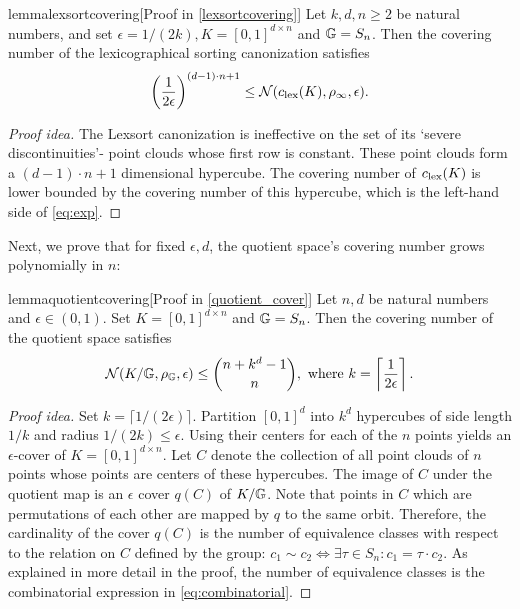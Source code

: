\begin{restatable}{lemma}{lexsortcovering}[Proof in \ref{lexsortcovering}]
\label{lem:lexsortcovering}
Let $k,d,n\geq 2$ be natural numbers, and set $\epsilon=1/(2k), K=[0,1]^{d\times n}$ and $\mathbb{G}=S_n$. Then the covering number of the lexicographical sorting canonization satisfies
\begin{equation}
\label{eq:exp}
\left( \frac{1}{2\epsilon}\right)^{(d-1)\cdot n + 1}\leq \mathcal{N}(c_{\mathrm{lex}}(K),\rho_\infty,\epsilon).
\end{equation}
\end{restatable}
\begin{proof}[Proof idea]
The Lexsort canonization is ineffective on the set of its `severe discontinuities'- point clouds whose first row is constant. These point clouds form a $(d-1)\cdot n+1 $ dimensional hypercube. The covering number of $c_{\mathrm{lex}}(K)$ is lower bounded by the covering number of this hypercube, which is the left-hand side of \eqref{eq:exp}.
\end{proof}
Next, we prove that for fixed $\epsilon,d$,  the quotient space's covering number grows polynomially in $n$:
\begin{restatable}{lemma}{quotientcovering}[Proof in \ref{quotient_cover}]
\label{lem:quotient_covering}
Let $n,d$ be natural numbers and $\epsilon\in (0,1)$. Set $K=[0,1]^{d\times n}$ and $\mathbb{G}=S_n$. Then the covering number of the quotient space satisfies
\begin{equation}
\label{eq:combinatorial}
\mathcal{N}(K/\mathbb{G},\rho_{\mathbb{G}},\epsilon)
\leq
\binom{n+k^{d}-1}{n},
\text{ where }
k=\left\lceil \frac{1}{2\epsilon} \right\rceil .
\end{equation}
\end{restatable}
\begin{proof}[Proof idea]
Set $k=\lceil 1/(2\epsilon) \rceil $. Partition $[0,1]^d$ into $k^d$ hypercubes of side length $1/k$ and radius $1/(2k)\leq \epsilon$. Using their centers for each of the $n$ points yields an $\epsilon$-cover of $K=[0,1]^{d\times n}$. Let $C$ denote the collection of all point clouds of $n$ points whose points are centers of these hypercubes. The image of $C$ under the quotient map is  an $\epsilon$ cover $q(C)$ of $K/\mathbb{G}$. Note that points in $C$ which are permutations of each other are mapped by $q$ to the same orbit. Therefore, the cardinality of the cover $q(C)$ is the number of equivalence classes with respect to the relation on $C$ defined by the group: $c_1 \sim c_2 \iff \exists \tau \in S_n : c_1 = \tau\cdot c_2$. As explained in more detail in the proof, the number of equivalence classes is the combinatorial expression in \eqref{eq:combinatorial}.
\end{proof}

